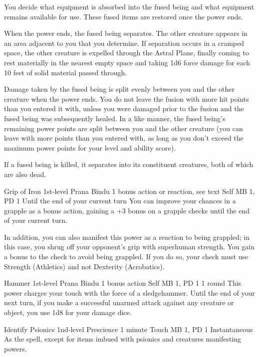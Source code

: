   You decide what equipment is absorbed into the fused being
  and what equipment remains available for use.
  These fused items are restored once the power ends.
  
  When the power ends,
  the fused being separates.
  The other creature appears in an area adjacent to you that you determine.
  If separation occurs in a cramped space,
  the other creature is expelled through the Astral Plane,
  finally coming to rest materially in the nearest empty space
  and taking 1d6 force damage
  for each 10 feet of solid material passed through.
  
  Damage taken by the fused being is split evenly
  between you and the other creature when the power ends.
  You do not leave the fusion with more hit points
  than you entered it with,
  unless you were damaged prior to the fusion
  and the fused being was subsequently healed.
  In a like manner,
  the fused being's remaining power points are split
  between you and the other creature
  (you can leave with more points than you entered with,
  as long as you don't exceed the maximum power points
  for your level and ability score).
  
  If a fused being is killed,
  it separates into its constituent creatures,
  both of which are also dead.

\DndPowerHeader%
  {Grip of Iron}
  {1st-level Prana Bindu}
  {1 bonus action or reaction, see text}
  {Self}
  {MB 1, PD 1}
  {Until the end of your current turn}
  You can improve your chances in a grapple as a bonus action,
  gaining a +3 bonus on a grapple checks until
  the end of your current turn.

  In addition, you can also manifest this power
  as a reaction to being grappled; in this case, you shrug
  off your opponent's grip with superhuman strength.
  You gain a bonus to the check to avoid being grappled.
  If you do so,
  your check must use Strength (Athletics) and not
  Dexterity (Acrobatics).

\DndPowerHeader%
  {Hammer}
  {1st-level Prana Bindu}
  {1 bonus action}
  {Self}
  {MB 1, PD 1}
  {1 round}
This power charges your touch with the force of a sledgehammer.
Until the end of your next turn,
if you make a successful unarmed attack against any creature or object,
you use 1d8 for your damage dice.

\DndPowerHeader%
  {Identify Psionics}
  {1nd-level Prescience}
  {1 minute}
  {Touch}
  {MB 1, PD 1}
  {Instantaneous}
As the  spell,
except for items imbued with psionics
and creatures manifesting powers.

